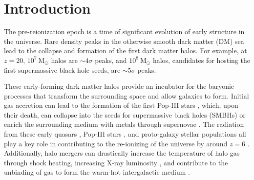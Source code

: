 
%
%

\section{Introduction}
\label{sec:introduction}







The pre-reionization epoch is a time of significant evolution of early structure in the universe.  Rare density peaks in the otherwise smooth dark matter (DM) sea lead to the collapse and formation of the first dark matter halos.  For example, at $z = 20$, $10^{7}~\mathrm{M}_{\odot}$ halos are $\sim 4\sigma$ peaks, and $10^{8}~\mathrm{M}_{\odot}$ halos, candidates for hosting the first supermassive black hole seeds, are $\sim 5\sigma$ peaks.

These early-forming dark matter halos provide an incubator for the baryonic processes that transform the surrounding space and allow galaxies to form.  Initial gas accretion can lead to the formation of the first Pop-III stars \citep{1986MNRAS.221...53C, 1997ApJ...474....1T, 2000ApJ...540...39A, 2002Sci...295...93A}, which, upon their death, can collapse into the seeds for supermassive black holes (SMBHs) \citep{2001ApJ...551L..27M, 2003MNRAS.340..647I, 2009ApJ...701L.133A, 2012ApJ...754...34J} or enrich the surrounding medium with metals through supernovae \citep{2002ApJ...567..532H, 2003ApJ...591..288H}.  The radiation from these early quasars \citep{1987ApJ...321L.107S, 1999ApJ...514..648M, 2001AJ....122.2833F}, Pop-III stars \citep{1997ApJ...486..581G, 2003ApJ...584..621V, 2006ApJ...639..621A}, and proto-galaxy stellar populations \citep{2012ApJ...752L...5B, 2012MNRAS.423..862K} all play a key role in contributing to the re-ionizing of the universe by around $z = 6$ \citep{2001PhR...349..125B}.  Additionally, halo mergers can drastically increase the temperature of halo gas through shock heating, increasing X-ray luminosity \citep{2009MNRAS.397..190S}, and contribute to the unbinding of gas to form the warm-hot intergalactic medium \citep{2008SSRv..134..141B, 2010MNRAS.405L..31S, 2012MNRAS.425.2974T}.




